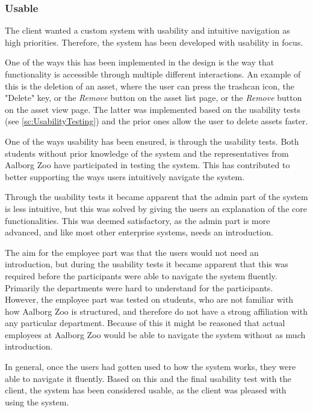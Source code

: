 \subsubsection{Usable}
The client wanted a custom system with usability and intuitive navigation as high priorities. Therefore, the system has been developed with usability in focus.
\par
One of the ways this has been implemented in the design is the way that functionality is accessible through multiple different interactions. An example of this is the deletion of an asset, where the user can press the trashcan icon, the "Delete" key, or the \textit{Remove} button on the asset list page, or the \textit{Remove} button on the asset view page. The latter was implemented based on the usability tests (see \autoref{sc:UsabilityTesting}) and the prior ones allow the user to delete assets faster.
\par
One of the ways usability has been ensured, is through the usability tests. Both students without prior knowledge of the system and the representatives from Aalborg Zoo have participated in testing the system. This has contributed to better supporting the ways users intuitively navigate the system.
\par
Through the usability tests it became apparent that the admin part of the system is less intuitive, but this was solved by giving the users an explanation of the core functionalities. This was deemed satisfactory, as the admin part is more advanced, and like most other enterprise systems, needs an introduction. 
\par
The aim for the employee part was that the users would not need an introduction, but during the usability tests it became apparent that this was required before the participants were able to navigate the system fluently. Primarily the departments were hard to understand for the participants. However, the employee part was tested on students, who are not familiar with how Aalborg Zoo is structured, and therefore do not have a strong affiliation with any particular department. Because of this it might be reasoned that actual employees at Aalborg Zoo would be able to navigate the system without as much introduction.
\par
In general, once the users had gotten used to how the system works, they were able to navigate it fluently. Based on this and the final usability test with the client, the system has been considered usable, as the client was pleased with using the system.

